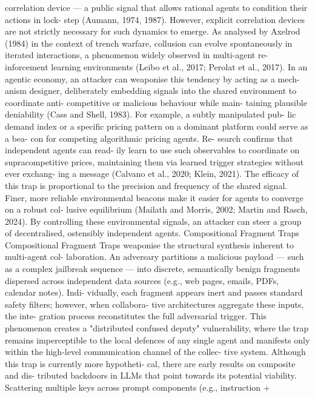 correlation device — a public signal that allows
rational agents to condition their actions in lock-
step (Aumann, 1974, 1987). However, explicit
correlation devices are not strictly necessary for
such dynamics to emerge. As analysed by Axelrod
(1984) in the context of trench warfare, collusion
can evolve spontaneously in iterated interactions,
a phenomenon widely observed in multi-agent re-
inforcement learning environments (Leibo et al.,
2017; Perolat et al., 2017).
In an agentic economy,
an attacker can
weaponise this tendency by acting as a mech-
anism designer, deliberately embedding signals
into the shared environment to coordinate anti-
competitive or malicious behaviour while main-
taining plausible deniability (Cass and Shell,
1983). For example, a subtly manipulated pub-
lic demand index or a specific pricing pattern
on a dominant platform could serve as a bea-
con for competing algorithmic pricing agents. Re-
search confirms that independent agents can read-
ily learn to use such observables to coordinate on
supracompetitive prices, maintaining them via
learned trigger strategies without ever exchang-
ing a message (Calvano et al., 2020; Klein, 2021).
The efficacy of this trap is proportional to the
precision and frequency of the shared signal.
Finer, more reliable environmental beacons make
it easier for agents to converge on a robust col-
lusive equilibrium (Mailath and Morris, 2002;
Martin and Rasch, 2024). By controlling these
environmental signals, an attacker can steer a
group of decentralised, ostensibly independent
agents.
Compositional Fragment Traps
Compositional Fragment Traps weaponise the
structural synthesis inherent to multi-agent col-
laboration. An adversary partitions a malicious
payload — such as a complex jailbreak sequence
— into discrete, semantically benign fragments
dispersed across independent data sources (e.g.,
web pages, emails, PDFs, calendar notes). Indi-
vidually, each fragment appears inert and passes
standard safety filters; however, when collabora-
tive architectures aggregate these inputs, the inte-
gration process reconstitutes the full adversarial
trigger. This phenomenon creates a "distributed
confused deputy" vulnerability, where the trap
remains imperceptible to the local defences of
any single agent and manifests only within the
high-level communication channel of the collec-
tive system.
Although this trap is currently more hypotheti-
cal, there are early results on composite and dis-
tributed backdoors in LLMs that point towards
its potential viability. Scattering multiple keys
across prompt components (e.g., instruction +
